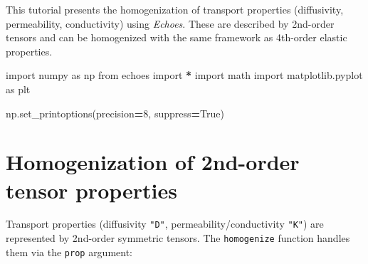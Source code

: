 \documentclass[
  a4paper,
  numbers=noendperiod,
  DIV=12]{scrreprt}
\newenvironment{Shaded}{\begin{snugshade}}{\end{snugshade}}
\newcommand{\DecValTok}[1]{\textcolor[rgb]{0.00,0.00,0.81}{#1}}
\newcommand{\ImportTok}[1]{#1}
\newcommand{\NormalTok}[1]{#1}
\newcommand{\OperatorTok}[1]{\textcolor[rgb]{0.81,0.36,0.00}{\textbf{#1}}}
\newcommand{\VariableTok}[1]{\textcolor[rgb]{0.00,0.00,0.00}{#1}}
\begin{document}
\begin{tcolorbox}[enhanced jigsaw, arc=.35mm, bottomrule=.15mm, bottomtitle=1mm, breakable, colback=white, colbacktitle=quarto-callout-important-color!10!white, colframe=quarto-callout-important-color-frame, coltitle=black, left=2mm, leftrule=.75mm, opacityback=0, opacitybacktitle=0.6, rightrule=.15mm, title={Objectives}, titlerule=0mm, toprule=.15mm, toptitle=1mm]

This tutorial presents the homogenization of transport properties
(diffusivity, permeability, conductivity) using \emph{Echoes}. These are
described by 2nd-order tensors and can be homogenized with the same
framework as 4th-order elastic properties.

\end{tcolorbox}

\begin{tcolorbox}[enhanced jigsaw, arc=.35mm, bottomrule=.15mm, bottomtitle=1mm, breakable, colback=white, colbacktitle=quarto-callout-tip-color!10!white, colframe=quarto-callout-tip-color-frame, coltitle=black, left=2mm, leftrule=.75mm, opacityback=0, opacitybacktitle=0.6, rightrule=.15mm, title={Imports}, titlerule=0mm, toprule=.15mm, toptitle=1mm]

\begin{Shaded}
\begin{Highlighting}[]
\ImportTok{import}\NormalTok{ numpy }\ImportTok{as}\NormalTok{ np}
\ImportTok{from}\NormalTok{ echoes }\ImportTok{import} \OperatorTok{*}
\ImportTok{import}\NormalTok{ math}
\ImportTok{import}\NormalTok{ matplotlib.pyplot }\ImportTok{as}\NormalTok{ plt}

\NormalTok{np.set\_printoptions(precision}\OperatorTok{=}\DecValTok{8}\NormalTok{, suppress}\OperatorTok{=}\VariableTok{True}\NormalTok{)}
\end{Highlighting}
\end{Shaded}

\end{tcolorbox}

\section{Homogenization of 2nd-order tensor
properties}\label{homogenization-of-2nd-order-tensor-properties}

Transport properties (diffusivity \texttt{"D"},
permeability/conductivity \texttt{"K"}) are represented by 2nd-order
symmetric tensors. The \texttt{homogenize} function handles them via the
\texttt{prop} argument:
\end{document}
